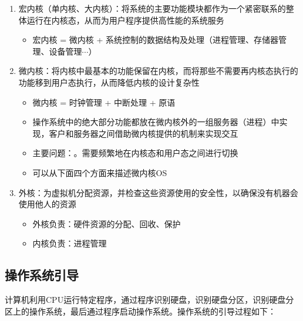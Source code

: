 \documentclass[./operating-systems.tex]{subfiles}
\begin{document}
\begin{enumerate}
        \item 宏内核（单内核、大内核）：将系统的主要功能模块都作为一个紧密联系的整体运行在内核态，从而为用户程序提供高性能的系统服务
        \begin{itemize}
            \item 宏内核 = 微内核 + 系统控制的数据结构及处理（进程管理、存储器管理、设备管理$\cdots$）
        \end{itemize}
        \item 微内核：将内核中最基本的功能保留在内核，而将那些不需要再内核态执行的功能移到用户态执行，从而降低内核的设计复杂性
        \begin{itemize}
            \item 微内核 = 时钟管理 + 中断处理 + 原语
            \item 操作系统中的绝大部分功能都放在微内核外的一组服务器（进程）中实现，客户和服务器之间借助微内核提供的{\color{red}{消息传递}}机制来实现交互
            \item 主要问题：{\color{red}{性能问题}}。需要频繁地在内核态和用户态之间进行切换
            \item 可以从下面四个方面来描述微内核OS
        \end{itemize}
        \item 外核：为虚拟机分配资源，并检查这些资源使用的安全性，以确保没有机器会使用他人的资源
        \begin{itemize}
            \item 外核负责：硬件资源的分配、回收、保护
            \item 内核负责：进程管理
        \end{itemize}
    \end{enumerate}

    \subsection{操作系统引导}

    计算机利用CPU运行特定程序，通过程序识别硬盘，识别硬盘分区，识别硬盘分区上的操作系统，最后通过程序启动操作系统。操作系统的引导过程如下：
\end{document}
